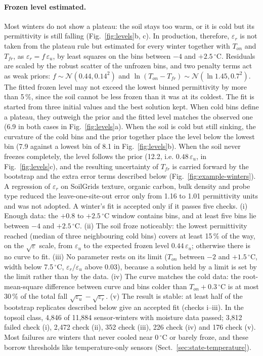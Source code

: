 \documentclass[essd,manuscript]{copernicus}
\begin{document}
\paragraph{Frozen level estimated.} Most winters do not show a plateau: the
soil stays too warm, or it is cold but its permittivity is still falling
(Fig.~\ref{fig:levels}b, c). In production, therefore, $\varepsilon_r$ is not
taken from the plateau rule but estimated for every winter together with
$T_{on}$ and $T_{fr}$, as $\varepsilon_r = f\,\varepsilon_u$, by least squares
on the bins between $-4$ and $+2.5$\,$^{\circ}$C. Residuals are scaled by the
robust scatter of the unfrozen bins, and two penalty terms act as weak priors:
$f \sim \mathcal{N}(0.44, 0.14^2)$ and $\ln(T_{on}-T_{fr}) \sim
\mathcal{N}(\ln 1.45, 0.7^2)$. The fitted frozen level may not exceed the lowest
binned permittivity by more than 5\,\%, since the soil cannot be less frozen
than it was at its coldest. The fit is started from three initial values and the best
solution kept. When cold bins define a plateau, they outweigh the prior and
the fitted level matches the observed one (6.9 in both cases in
Fig.~\ref{fig:levels}a). When the soil is cold but still sinking, the curvature
of the cold bins and the prior together place the level below the lowest bin
(7.9 against a lowest bin of 8.1 in Fig.~\ref{fig:levels}b). When the soil
never freezes completely, the level follows the prior (12.2, i.e.
$0.48\,\varepsilon_u$, in Fig.~\ref{fig:levels}c), and the resulting
uncertainty of $T_{fr}$ is carried forward by the bootstrap and the extra error
terms described below (Fig.~\ref{fig:example-winters}).
A regression of $\varepsilon_r$ on SoilGrids
texture, organic carbon, bulk density and probe type reduced the
leave-one-site-out error only from 1.16 to 1.01 permittivity units and was not
adopted. A winter's fit is accepted only if it passes five checks. (i) Enough data:
the $+0.8$ to $+2.5$\,$^{\circ}$C window contains bins, and at least five bins
lie between $-4$ and $+2.5$\,$^{\circ}$C. (ii) The soil froze noticeably: the
lowest permittivity reached (median of three neighbouring cold bins) covers at
least 15\,\% of the way, on the $\sqrt{\varepsilon}$ scale, from $\varepsilon_u$
to the expected frozen level $0.44\,\varepsilon_u$; otherwise there is no curve
to fit. (iii) No parameter rests on its limit ($T_{on}$ between $-2$ and
$+1.5$\,$^{\circ}$C, width below 7.5\,$^{\circ}$C, $\varepsilon_r/\varepsilon_u$
above 0.03), because a solution held by a limit is set by the limit rather
than by the data. (iv) The curve matches the cold data: the root-mean-square
difference between curve and bins colder than $T_{on}+0.3$\,$^{\circ}$C is at
most 30\,\% of the total fall $\sqrt{\varepsilon_u}-\sqrt{\varepsilon_r}$. (v)
The result is stable: at least half of the bootstrap replicates described
below give an accepted fit (checks i--iii). In the topsoil class, 4,846 of
11,884 sensor-winters with moisture data passed; 3,812 failed check (i), 2,472
check (ii), 352 check (iii), 226 check (iv) and 176 check (v). Most failures
are winters that never cooled near 0\,$^{\circ}$C or barely froze, and these
borrow thresholds like temperature-only sensors
(Sect.~\ref{sec:state-temperature}).
\end{document}
